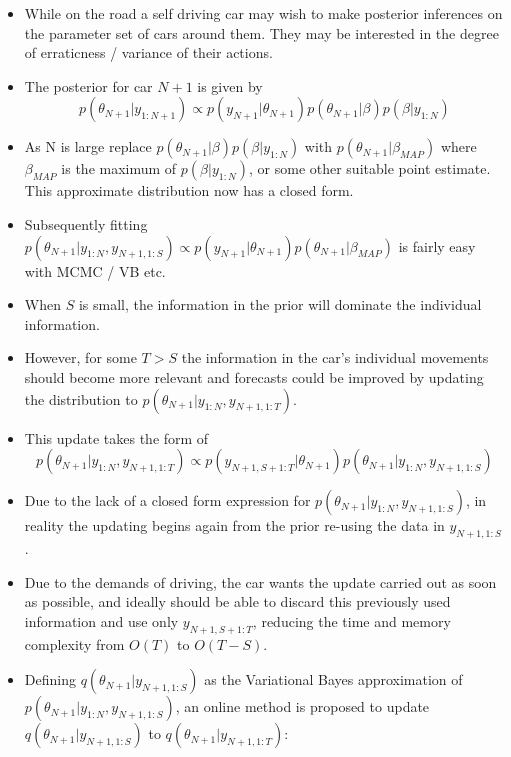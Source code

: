 \documentclass[12pt,a4paper]{article}\usepackage[]{graphicx}\usepackage[]{color}
\begin{document}
\begin{itemize}
\item While on the road a self driving car may wish to make posterior inferences on the parameter set of cars around them. They may be interested in the degree of erraticness / variance of their actions.
\item The posterior for car $N+1$ is given by 
\begin{equation}
p(\theta_{N+1} | y_{1:N+1}) \propto p(y_{N+1} | \theta_{N+1}) p(\theta_{N+1} | \beta) p (\beta | y_{1:N})
\end{equation}
\item As N is large replace $ p(\theta_{N+1} | \beta) p (\beta | y_{1:N})$ with $ p(\theta_{N+1} | \beta_{MAP})$ where $\beta_{MAP}$ is the maximum of $p(\beta | y_{1:N})$, or some other suitable point estimate. This approximate distribution now has a closed form. 
\item Subsequently fitting $p(\theta_{N+1} | y_{1:N}, y_{N+1, 1:S})  \propto p(y_{N+1} | \theta_{N+1}) p(\theta_{N+1} | \beta_{MAP})$ is fairly easy with MCMC / VB etc.
\item When $S$ is small, the information in the prior will dominate the individual information.
\item However, for some $T > S$ the information in the car's individual movements should become more relevant and forecasts could be improved by updating the distribution to $p(\theta_{N+1} | y_{1:N}, y_{N+1, 1:T})$.
\item This update takes the form of
\begin{equation}
p(\theta_{N+1} | y_{1:N}, y_{N+1, 1:T}) \propto p(y_{N+1, S+1:T} | \theta_{N+1}) p(\theta_{N+1} | y_{1:N}, y_{N+1, 1:S})
\end{equation}
\item Due to the lack of a closed form expression for $p(\theta_{N+1} | y_{1:N}, y_{N+1, 1:S})$, in reality the updating begins again from the prior re-using the data in $y_{N+1, 1:S}$.
\item Due to the demands of driving, the car wants the update carried out as soon as possible, and ideally should be able to discard this previously used information and use only $y_{N+1, S+1:T}$, reducing the time and memory complexity from $O(T)$ to $O(T-S)$. 
\item Defining $q(\theta_{N+1} | y_{N+1, 1:S})$ as the Variational Bayes approximation of $p(\theta_{N+1} | y_{1:N}, y_{N+1, 1:S})$, an online method is proposed to update $q(\theta_{N+1} | y_{N+1, 1:S})$ to $q(\theta_{N+1} | y_{N+1, 1:T})$:

\end{itemize}
\end{document}
